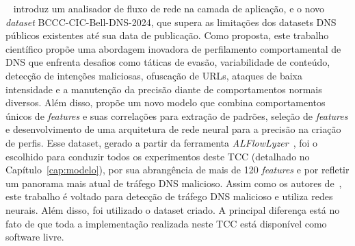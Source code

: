 ~\citet{shafi2024dns} introduz um analisador de fluxo de rede na camada de aplicação, e o novo \textit{dataset} BCCC-CIC-Bell-DNS-2024, que supera as limitações dos datasets DNS públicos existentes até sua data de publicação. Como proposta, este trabalho científico propõe uma abordagem inovadora de perfilamento comportamental de DNS que enfrenta desafios como táticas de evasão, variabilidade de conteúdo, detecção de intenções maliciosas, ofuscação de URLs, ataques de baixa intensidade e a manutenção da precisão diante de comportamentos normais diversos. Além disso, propõe um novo modelo que combina comportamentos únicos de \textit{features} e suas correlações para extração de padrões, seleção de \textit{features} e desenvolvimento de uma arquitetura de rede neural para a precisão na criação de perfis.
Esse dataset, gerado a partir da ferramenta \textit{ALFlowLyzer}~\citep{shafi2024a}, foi o escolhido para conduzir todos os experimentos deste TCC (detalhado no Capítulo~\ref{cap:modelo}), por sua abrangência de mais de 120 \textit{features} e por refletir um panorama mais atual de tráfego DNS malicioso.
Assim como os autores de~\citet{SHAFI2024109436}, este trabalho é voltado para detecção de tráfego DNS malicioso e utiliza redes neurais. Além disso, foi utilizado o dataset criado. A principal diferença está no fato de que toda a implementação realizada neste TCC está disponível como software livre.


